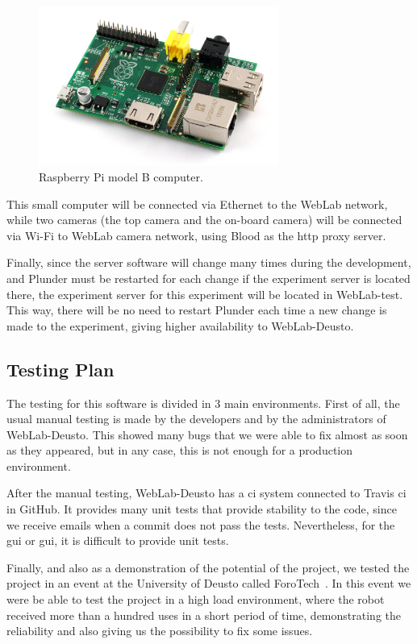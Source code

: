 \begin{figure}[!htbp]
	\centering
	\includegraphics[width=0.7\textwidth]{fig/rasp}
	\caption{Raspberry Pi model B computer.}
	\label{fig:rasp}
\end{figure}

This small computer will be connected via Ethernet to the WebLab network, while two cameras (the top
camera and the on-board camera) will be connected via Wi-Fi to WebLab camera network, using Blood as
the \acrshort{http} proxy server.

Finally, since the server software will change many times during the development, and Plunder must
be restarted for each change if the experiment server is located there, the experiment server for
this experiment will be located in WebLab-test. This way, there will be no need to restart Plunder
each time a new change is made to the experiment, giving higher availability to WebLab-Deusto.

\subsection{Testing Plan}

The testing for this software is divided in 3 main environments. First of all, the usual manual
testing is made by the developers and by the administrators of WebLab-Deusto. This showed many bugs
that we were able to fix almost as soon as they appeared, but in any case, this is not enough
for a production environment.

After the manual testing, WebLab-Deusto has a \acrlong{ci} system connected to Travis \acrshort{ci}
in GitHub. It provides many unit tests that provide stability to the code, since we receive emails
when a commit does not pass the tests. Nevertheless, for the \acrlong{gui} or \acrshort{gui}, it is
difficult to provide unit tests.

Finally, and also as a demonstration of the potential of the project, we tested the project in an
event at the University of Deusto called ForoTech~\cite{forotech}. In this event we were be able to
test the project in a high load environment, where the robot received more than a hundred uses in a
short period of time, demonstrating the reliability and also giving us the possibility to fix some
issues.

